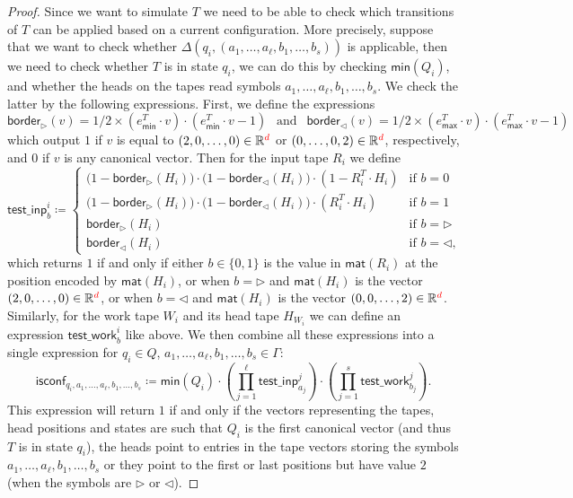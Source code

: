\begin{proof}
Since we want to simulate $T$ we need to be able to check which 
    transitions of $T$ can be applied based on a current configuration. More precisely,
    suppose that we want to check whether $\Delta(q_i,(a_1,\ldots,a_{\ell},b_1,\ldots, b_s))$ is applicable, then we 
    need to check whether $T$ is in state $q_i$, we can do this by checking 
    $\mathsf{min}(Q_i)$, and whether the heads on the tapes read symbols $a_1,\ldots,a_{\ell},b_1, \ldots, b_s$. We 
    check the latter by the following expressions.
    First, we define the expressions 
    $$
    \mathsf{border}_{\rhd}(v) = 1/2 \times (e_{\mathsf{min}}^T \cdot v) \cdot (e_{\mathsf{min}}^T \cdot v - 1) \ \ \text{ and } \ \  \mathsf{border}_{\lhd}(v) = 1/2 \times (e_{\mathsf{max}}^T \cdot v) \cdot (e_{\mathsf{max}}^T \cdot v - 1)
    $$
    which output $1$ if $v$ is equal to $(2,0,\ldots,0)\in\mathbb{R}^{\color{red} d}$ or $(0, \ldots, 0, 2)\in\mathbb{R}^{\color{red} d}$, respectively, and $0$ if $v$ is any canonical vector.
    Then for the input tape $R_i$ we define
    $$
    \mathsf{test\_inp}^i_b\coloneqq \begin{cases}
    \bigl(1-\mathsf{border}_{\rhd}(H_i)\bigr)\cdot \bigl(1-\mathsf{border}_{\lhd}(H_i)\bigr)\cdot(1- R_i^T\cdot H_i) & \text{if $b=0$}\\
    \bigl(1-\mathsf{border}_{\rhd}(H_i)\bigr)\cdot \bigl(1-\mathsf{border}_{\lhd}(H_i)\bigr)\cdot(R_i^T\cdot H_i) & \text{if $b=1$}\\
    \mathsf{border}_{\rhd}(H_i) & \text{if $b=\rhd$}\\
    \mathsf{border}_{\lhd}(H_i) & \text{if $b=\lhd$},
    \end{cases}
    $$
    which returns $1$ if and only if either $b\in\{0,1\}$ is the value in $\mathsf{mat}(R_i)$ at the 
    position encoded by $\mathsf{mat}(H_i)$, or when $b=\rhd$ and $\mathsf{mat}(H_i)$ is the vector 
    $(2,0,\ldots,0)\in\mathbb{R}^{\color{red} d}$, or when $b=\lhd$ and $\mathsf{mat}(H_i)$ is the vector 
    $(0,0,\ldots,2)\in\mathbb{R}^{\color{red} d}$.
    Similarly, for the work tape $W_i$ and its head tape $H_{W_i}$ we can define an expression $\mathsf{test\_work}^i_b$ like above.
    We then combine all these expressions into a single expression for $q_i\in Q$, 
    $a_1,\ldots,a_\ell,b_1,\ldots, b_s\in\Gamma$:
    $$
    \mathsf{isconf}_{q_i,a_1,\ldots,a_\ell,b_1,\ldots, b_s}\coloneqq 
    \mathsf{min}(Q_i)\cdot \left(\prod_{j=1}^{\ell} \mathsf{test\_inp}_{a_j}^j\right)
    \cdot\left(\prod_{j=1}^{s} \mathsf{test\_work}_{b_j}^j\right).
    $$
    This expression will return $1$ if and only if the vectors representing the tapes, 
    head positions and states are such that $Q_i$ is the first canonical vector 
    (and thus $T$ is in state $q_i$), the heads point to entries in the tape vectors storing 
    the symbols $a_1,\ldots,a_{\ell}, b_1, \ldots, b_s$ or they point to the first or last positions but have value $2$ (when the symbols are $\rhd$ or $\lhd$). 


\end{proof}
